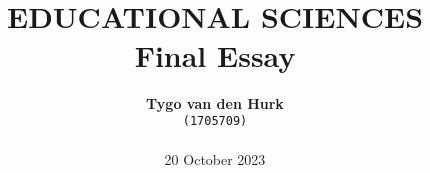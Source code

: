     \title{ 
        \normalsize 
        \textsc{} \\
        [2.0cm]
        \HRule{1.5pt} \\
        \LARGE \textbf{
            \uppercase{
             Educational sciences}
        \HRule{2.0pt} \\ 
        [0.6cm] 
        \LARGE{
            Final Essay}
        \vspace*{
            10\baselineskip}}}
    \date{}
    \author{
        \textbf{Tygo van den Hurk} \\
        \texttt{(1705709)}\\ 
        \bigskip\\
        20 October 2023}
    \maketitle
    \thispagestyle{empty}
    \newpage